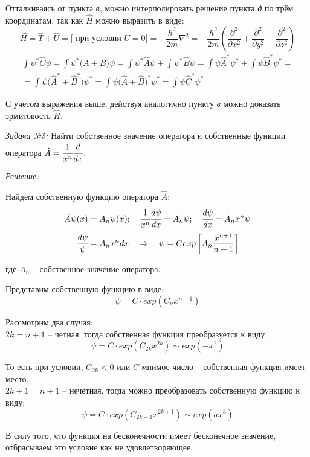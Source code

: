 Отталкиваясь от пункта \emph{в}, можно интерполировать решение пункта \emph{д} по 
трём координатам, так как \( \hat{H} \) можно выразить в виде:
\[
	\hat{H} = \hat{T} + \hat{U} = \Big[ \text{ при условии } U = 0 \Big] = 
	-\frac{\hbar^2}{2m}\nabla^{2} = -\frac{\hbar^2}{2m}\left( 
	\frac{\partial^2}{\partial x^2} + \frac{\partial^2}{\partial y^2} + 
	\frac{\partial^2}{\partial z^2}\right)
\]
\[
\begin{array}{ll}
	\int \psi^{*} \hat{C} \psi = \int \psi^{*} \Big( A \pm B \Big) \psi = 
	\int \psi^{*} \hat{A} \psi \pm \int \psi^{*} \hat{B} \psi = 
	\int \psi \hat{A}^{*} \psi^{*} \pm \int \psi \hat{B}^{*} \psi^{*} = \\ =
	\int \psi \Big( \hat{A}^{*} \pm \hat{B}^{*} \Big) \psi^{*} = 
	\int \psi \Big( \hat{A} \pm \hat{B} \Big)^{*} \psi^{*} = 
	\int \psi \hat{C}^{*} \psi^{*}
\end{array}
\]

С учётом выражения выше, действуя аналогично пункту \emph{в} можно доказать 
эрмитовость \( \hat{H} \).

\pagebreak

\emph{Задача №5:} Найти собственное значение оператора и собственные функции 
оператора \( \hat{A} = \cfrac{1}{x^n}\cfrac{d}{dx} \).

\emph{Решение:}

Найдём собственную функцию оператора \( \hat{A} \):
\[
	\hat{A}\psi(x) = A_n \psi(x); \quad
	\cfrac{1}{x^n}\cfrac{d\psi}{dx} = A_n\psi; \quad
	\cfrac{d\psi}{dx} = A_n x^n \psi
\]
\[
	\cfrac{d\psi}{\psi} = A_n x^n dx \quad \Rightarrow \quad
	\psi = C exp\left[ A_n \frac{x^{n+1}}{n+1} \right]
\]

где \( A_n \) -- собственное значение оператора.

Представим собственную функцию в виде:
\[
	\psi = C\cdot exp( C_n x^{n+1} )
\]

Рассмотрим два случая: \\

\( 2k = n + 1 \) -- четная, тогда собственная функция преобразуется к виду:
\[
	\psi = C\cdot exp( C_{2k} x^{2k} ) \sim exp( -x^2 )
\]

То есть при условии, \( C_{2k} < 0 \) или \( C \) мнимое число -- собственная 
функция имеет место. \\

\( 2k + 1 = n + 1 \) -- нечётная, тогда можно преобразовать собственную 
функцию к виду:
\[
	\psi = C\cdot exp( C_{2k+1} x^{2k+1} ) \sim exp( ax^3 )
\] 

В силу того, что функция на бесконечности имеет бесконечное значение, 
отбрасываем это условие как не удовлетворяющее. 




